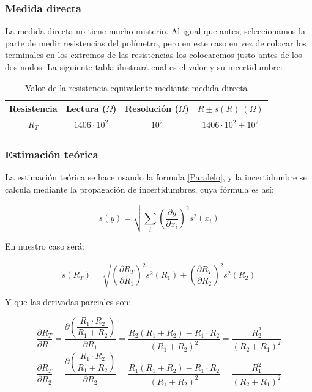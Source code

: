 \documentclass[10pt,a4paper]{article}
\begin{document}
\subsubsection{Medida directa}
La medida directa no tiene mucho misterio. Al igual que antes, seleccionamos la parte de medir resistencias del polímetro, pero en este caso en vez de colocar los terminales en los extremos de las resistencias los colocaremos justo antes de los dos nodos. La siguiente tabla ilustrará cual es el valor y su incertidumbre:
\\
\begin{table}[h] %

\begin{center}
\begin{tabular}{| c | c | c | c |}
\hline
Resistencia & Lectura ($\Omega$) & Resolución ($\Omega$) & $R \pm s(R) \ (\Omega)$ \\ \hline
$R_T$ & $1406 \cdot 10^2 $ & $10^2$  & $1406 \cdot 10^2 \pm 10^2$ \\ \hline
\end{tabular}
\caption{Valor de la resistencia equivalente mediante medida directa}

\label{tab:Paralelo 1}
\end{center}
\end{table}
\subsubsection{Estimación teórica}

La estimación teórica se hace usando la formula \ref{Paralelo}, y la incertidumbre se calcula mediante la propagación de incertidumbres, cuya fórmula es así:

\begin{equation}
s(y)=\sqrt{\sum_i (\dfrac{\partial y}{ \partial x_i})^2s^2(x_i)}
\label{Fórmula de propagación de incertidumbres}
\end{equation} 

En nuestro caso será:

\begin{equation}
s(R_T)=\sqrt{(\dfrac{\partial R_T}{ \partial R_1})^2s^2(R_1)+(\dfrac{\partial R_T}{ \partial R_2})^2s^2(R_2)}
\label{Propagación de incertidumbres estimación teórica}
\end{equation}

Y que las derivadas parciales son:

\begin{equation}
\dfrac{\partial R_T}{ \partial R_1}=\dfrac{\partial (\dfrac{R_1 \cdot R_2}{R_1 + R_2})}{\partial R_1}=\dfrac{R_2(R_1+R_2)-R_1 \cdot R_2}{(R_1+R_2)^2} = \dfrac{R_2^2}{(R_2+R_1)^2}
\end{equation}
\begin{equation}
\dfrac{\partial R_T}{ \partial R_2}=\dfrac{\partial (\dfrac{R_1 \cdot R_2}{R_1 + R_2})}{\partial R_2}=\dfrac{R_1(R_1+R_2)-R_1 \cdot R_2}{(R_1+R_2)^2} = \dfrac{R_1^2}{(R_2+R_1)^2}
\end{equation}
\end{document}
